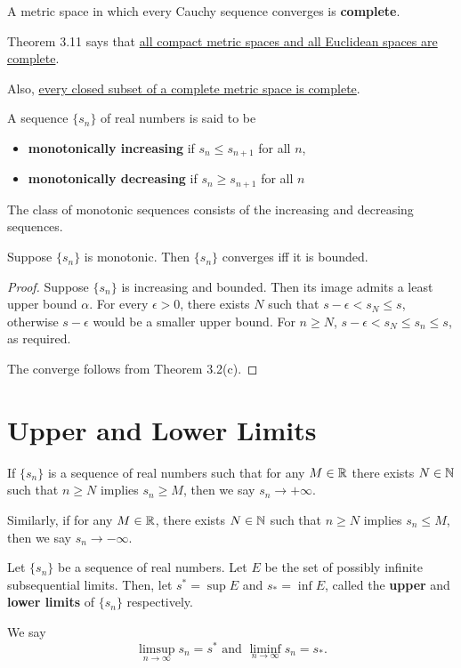 \begin{definition} %
A metric space in which every Cauchy sequence converges is \textbf{complete}. 

Theorem 3.11 says that \underline{all compact metric spaces and all Euclidean spaces are complete}. 

Also, \underline{every closed subset of a complete metric space is complete}.
\end{definition}

\begin{definition} %
A sequence $\{s_n\}$ of real numbers is said to be
\begin{itemize}
\item \textbf{monotonically increasing} if $s_n \le s_{n+1}$ for all $n$,
\item \textbf{monotonically decreasing} if $s_n \ge s_{n+1}$ for all $n$
\end{itemize}

The class of monotonic sequences consists of the increasing and decreasing sequences.
\end{definition}

\begin{theorem} %
Suppose $\{s_n\}$ is monotonic. Then $\{s_n\}$ converges iff it is bounded.

\begin{proof}
Suppose $\{s_n\}$ is increasing and bounded. Then its image admits a least upper bound $\alpha$. For every $\epsilon > 0$, there exists $N$ such that $s - \epsilon < s_N \le s$, otherwise $s - \epsilon$ would be a smaller upper bound. For $n \ge N$, $s - \epsilon < s_N \le s_n \le s$, as required.

The converge follows from Theorem 3.2(c).
\end{proof}
\end{theorem}

\section{Upper and Lower Limits}

\begin{definition} %
If $\{s_n\}$ is a sequence of real numbers such that for any $M \in \mathbb{R}$ there exists $N \in \mathbb{N}$ such that $n \ge N$ implies $s_n \ge M$, then we say $s_n \to +\infty$. 

Similarly, if for any $M \in \mathbb{R}$, there exists $N \in \mathbb{N}$ such that $n \ge N$ implies $s_n \le M$, then we say $s_n \to -\infty$. 

Let $\{s_n\}$ be a sequence of real numbers. Let $E$ be the set of possibly infinite subsequential limits. Then, let $s^* = \sup E$ and $s_* = \inf E$, called the \textbf{upper} and \textbf{lower limits} of $\{s_n\}$ respectively. 

We say
\[
	\limsup_{n \to \infty} s_n = s^* \text{ and } \liminf_{n \to \infty} s_n = s_*.
\]
\end{definition}

